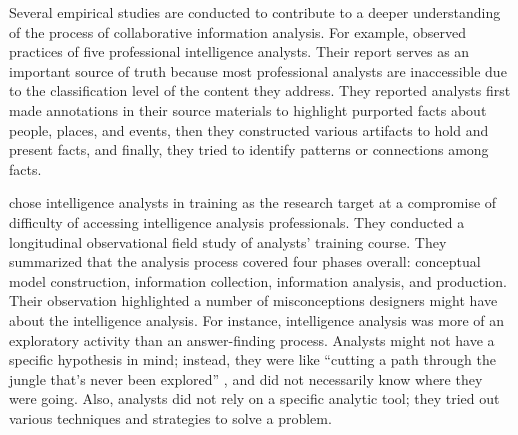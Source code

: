 Several empirical studies are conducted to contribute to a deeper understanding
of the process of collaborative information analysis. For example, \cite{Chin2009} observed practices of five professional intelligence analysts. Their report serves as an important source of truth because most professional analysts are inaccessible due to the classification level of
the content they address. They reported analysts first made annotations in their
source materials to highlight purported facts about people, places, and events,
then they constructed various artifacts to hold and present facts, and finally,
they tried to identify patterns or connections among facts. 

\cite{Kang2012b} chose intelligence analysts in training as the research target at a compromise of difficulty of accessing intelligence analysis professionals. They conducted a longitudinal observational field study of analysts' training course. They summarized that the analysis process covered four phases
overall: conceptual model construction, information collection, information
analysis, and production. Their observation highlighted a number of
misconceptions designers might have about the intelligence analysis. For
instance, intelligence analysis was more of an exploratory activity than an
answer-finding process. Analysts might not have a specific hypothesis in mind;
instead, they were like ``cutting a path through the jungle that’s never been
explored'' \citep[p.145]{Kang2012b}, and did not necessarily know where they
were going. Also, analysts did not rely
on a specific analytic tool; they tried out various techniques and strategies to
solve a problem. 

